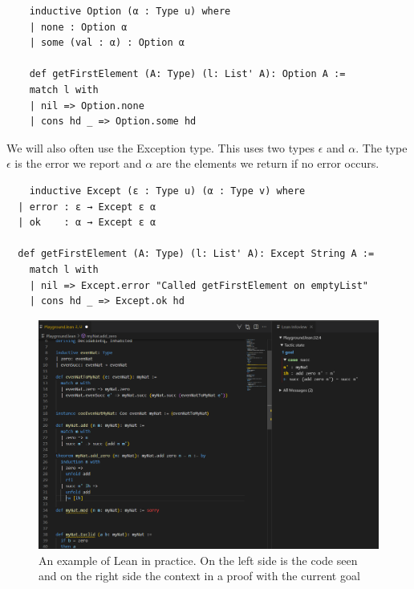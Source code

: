 \begin{lstlisting}
    inductive Option (α : Type u) where
    | none : Option α
    | some (val : α) : Option α

    def getFirstElement (A: Type) (l: List' A): Option A :=
    match l with
    | nil => Option.none
    | cons hd _ => Option.some hd
\end{lstlisting}

We will also often use the Exception type. This uses two types $\epsilon$ and $\alpha$. The type $\epsilon$ is the error we report and $\alpha$ are the elements we return if no error occurs.


\begin{lstlisting}
    inductive Except (ε : Type u) (α : Type v) where
  | error : ε → Except ε α
  | ok    : α → Except ε α

  def getFirstElement (A: Type) (l: List' A): Except String A :=
    match l with
    | nil => Except.error "Called getFirstElement on emptyList"
    | cons hd _ => Except.ok hd
\end{lstlisting}

\begin{figure}[H]
    \centering
    \includegraphics[width=\textwidth]{Lean_example2.png}
    \caption{An example of Lean in practice. On the left side is the code seen and on the right side the context in a proof with the current goal}
\end{figure}
